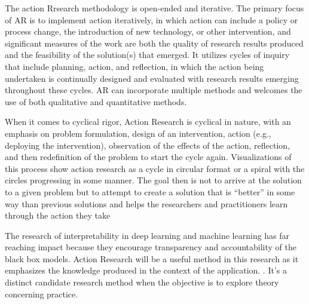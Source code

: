 The action Rrsearch methodology is open-ended and iterative. The primary focus of AR is to implement action iteratively, in which action can include a policy or process change, the introduction of new technology, or other intervention, and significant measures of the work are both the quality of research results produced and the feasibility of the solution(s) that emerged. It utilizes cycles of inquiry that include planning, action, and reflection, in which the action being undertaken is continually designed and evaluated with research results emerging throughout these cycles. AR can incorporate multiple methods and welcomes the use of both qualitative and quantitative methods.

When it comes to cyclical rigor, Action Research is cyclical in nature, with an emphasis on problem formulation, design of an intervention, action (e.g., deploying the intervention), observation of the effects of the action, reflection, and then redefinition of the problem to start the cycle again. Visualizations of this process show action research as a cycle in circular format or a spiral with the circles progressing in some manner. The goal then is not to arrive at the solution to a given problem but to attempt to create a solution that is “better” in some way than previous solutions and helps the researchers and practitioners learn through the action they take

The research of interpretability in deep learning and machine learning has far reaching impact because they encourage transparency and accountability of the black box models. Action Research will be a useful method in this research as it emphasizes the knowledge produced in the context of the application. \cite{401014119781201}. It’s a distinct candidate research method when the objective is to explore theory concerning practice.

